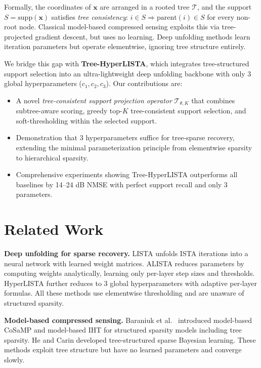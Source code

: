 \documentclass{article}
\begin{document}
Formally, the coordinates of $\mathbf{x}$ are arranged in a rooted tree $\mathcal{T}$, and the support $S = \mathrm{supp}(\mathbf{x})$ satisfies \emph{tree consistency}: $i \in S \Rightarrow \mathrm{parent}(i) \in S$ for every non-root node. Classical model-based compressed sensing \cite{baraniuk2010model} exploits this via tree-projected gradient descent, but uses no learning. Deep unfolding methods learn iteration parameters but operate elementwise, ignoring tree structure entirely.

We bridge this gap with \textbf{Tree-HyperLISTA}, which integrates tree-structured support selection into an ultra-lightweight deep unfolding backbone with only 3 global hyperparameters ($c_1, c_2, c_3$). Our contributions are:
\begin{itemize}
    \item A novel \emph{tree-consistent support projection operator} $\mathcal{T}_{\theta,K}$ that combines subtree-aware scoring, greedy top-$K$ tree-consistent support selection, and soft-thresholding within the selected support.
    \item Demonstration that 3 hyperparameters suffice for tree-sparse recovery, extending the minimal parameterization principle from elementwise sparsity to hierarchical sparsity.
    \item Comprehensive experiments showing Tree-HyperLISTA outperforms all baselines by 14--24 dB NMSE with perfect support recall and only 3 parameters.
\end{itemize}

\section{Related Work}

\textbf{Deep unfolding for sparse recovery.} LISTA \cite{gregor2010lista} unfolds ISTA iterations into a neural network with learned weight matrices. ALISTA \cite{liu2019alista} reduces parameters by computing weights analytically, learning only per-layer step sizes and thresholds. HyperLISTA \cite{chen2021hyperlista} further reduces to 3 global hyperparameters with adaptive per-layer formulas. All these methods use elementwise thresholding and are unaware of structured sparsity.

\textbf{Model-based compressed sensing.} Baraniuk et al.\ \cite{baraniuk2010model} introduced model-based CoSaMP and model-based IHT for structured sparsity models including tree sparsity. He and Carin \cite{he2011tree} developed tree-structured sparse Bayesian learning. These methods exploit tree structure but have no learned parameters and converge slowly.
\end{document}
